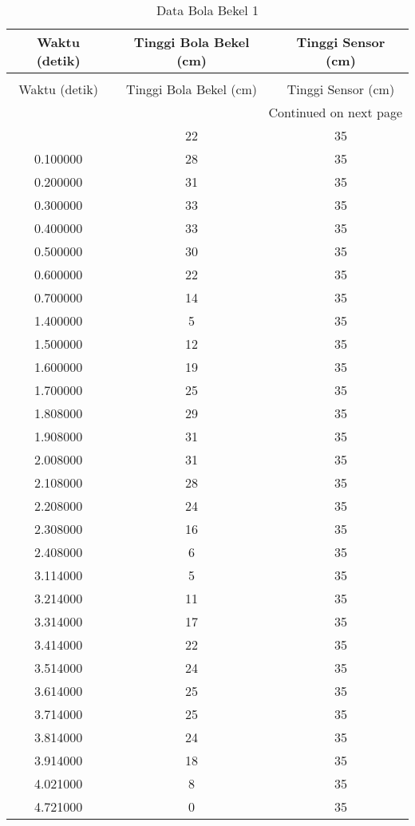 \begin{longtable}[htbp]{|c|c|c|}
\caption{Data Bola Bekel 1} \\
\hline
Waktu (detik) & Tinggi Bola Bekel (cm) & Tinggi Sensor (cm) \\ \hline
\endfirsthead
\caption[]{Data Bola Bekel 1} \\
\hline
Waktu (detik) & Tinggi Bola Bekel (cm) & Tinggi Sensor (cm) \\ \hline
\endhead
\multicolumn{3}{r}{Continued on next page} \\
\endfoot
\endlastfoot
0.733918 & 22 & 35 \\ \hline
0.100000 & 28 & 35 \\ \hline
0.200000 & 31 & 35 \\ \hline
0.300000 & 33 & 35 \\ \hline
0.400000 & 33 & 35 \\ \hline
0.500000 & 30 & 35 \\ \hline
0.600000 & 22 & 35 \\ \hline
0.700000 & 14 & 35 \\ \hline
1.400000 & 5 & 35 \\ \hline
1.500000 & 12 & 35 \\ \hline
1.600000 & 19 & 35 \\ \hline
1.700000 & 25 & 35 \\ \hline
1.808000 & 29 & 35 \\ \hline
1.908000 & 31 & 35 \\ \hline
2.008000 & 31 & 35 \\ \hline
2.108000 & 28 & 35 \\ \hline
2.208000 & 24 & 35 \\ \hline
2.308000 & 16 & 35 \\ \hline
2.408000 & 6 & 35 \\ \hline
3.114000 & 5 & 35 \\ \hline
3.214000 & 11 & 35 \\ \hline
3.314000 & 17 & 35 \\ \hline
3.414000 & 22 & 35 \\ \hline
3.514000 & 24 & 35 \\ \hline
3.614000 & 25 & 35 \\ \hline
3.714000 & 25 & 35 \\ \hline
3.814000 & 24 & 35 \\ \hline
3.914000 & 18 & 35 \\ \hline
4.021000 & 8 & 35 \\ \hline
4.721000 & 0 & 35 \\ \hline

\end{longtable}
